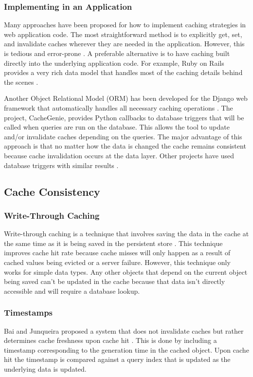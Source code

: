 \documentclass[12pt]{ucthesis}
\begin{document}
\subsubsection{Implementing in an Application}
Many approaches have been proposed for how to implement caching strategies in web application code.
The most straightforward method is to explicitly get, set, and invalidate caches wherever they are needed in the application.
However, this is tedious and error-prone \cite{keyBasedCacheExpiration, triggerBasedORM}.
A preferable alternative is to have caching built directly into the underlying application code.
For example, Ruby on Rails provides a very rich data model that handles most of the caching details behind the scenes \cite{keyBasedCacheExpiration}.

Another Object Relational Model (ORM) has been developed for the Django web framework that automatically handles all necessary caching operations \cite{triggerBasedORM}.
The project, CacheGenie, provides Python callbacks to database triggers that will be called when queries are run on the database. This allows the tool to update and/or invalidate caches depending on the queries.
The major advantage of this approach is that no matter how the data is changed the cache remains consistent because cache invalidation occurs at the data layer.
Other projects have used database triggers with similar results \cite{scalableConsistentCaching}.

\subsection{Cache Consistency}
\subsubsection{Write-Through Caching}
Write-through caching is a technique that involves saving the data in the cache at the same time as it is being saved in the persistent store \cite{writeThroughCaching}.
This technique improves cache hit rate because cache misses will only happen as a result of cached values being evicted or a server failure.
However, this technique only works for simple data types.
Any other objects that depend on the current object being saved can't be updated in the cache because that data isn't directly accessible and will require a database lookup.

\subsubsection{Timestamps}
Bai and Junqueira proposed a system that does not invalidate caches but rather determines cache freshness upon cache hit \cite{cacheInvalidationWebSearch}.
This is done by including a timestamp corresponding to the generation time in the cached object.
Upon cache hit the timestamp is compared against a query index that is updated as the underlying data is updated.
\end{document}
